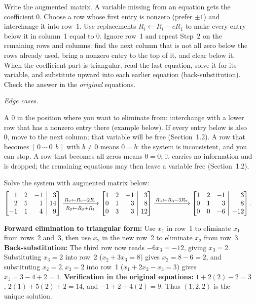 \documentclass[10pt]{scrartcl}
\makeatletter
\newcommand{\aug}[2]{\left[\begin{array}{@{}#1@{}}#2\end{array}\right]}
\makeatother
\begin{document}
\begin{steps}
  \ii Write the augmented matrix. A variable missing from an equation gets the coefficient $0$.
  \ii Choose a row whose first entry is nonzero (prefer $\pm1$) and interchange it into row~1. Use replacements $R_i\leftarrow R_i-cR_1$ to make every entry below it in column~1 equal to $0$.
  \ii Ignore row~1 and repeat Step~2 on the remaining rows and columns: find the next column that is not all zero below the rows already used, bring a nonzero entry to the top of it, and clear below it.
  \ii When the coefficient part is triangular, read the last equation, solve it for its variable, and substitute upward into each earlier equation (back-substitution).
  \ii Check the answer in the \emph{original} equations.
\end{steps}
\emph{Edge cases.}
\begin{itemize}
  \ii A $0$ in the position where you want to eliminate from: interchange with a lower row that has a nonzero entry there (example below). If every entry below is also $0$, move to the next column; that variable will be free (Section~1.2).
  \ii A row that becomes $[\,0\ \cdots\ 0\ \ b\,]$ with $b\ne0$ means $0=b$: the system is inconsistent, and you can stop.
  \ii A row that becomes all zeros means $0=0$: it carries no information and is dropped; the remaining equations may then leave a variable free (Section~1.2).
\end{itemize}

\begin{example*}
Solve the system with augmented matrix below:
\[
  \aug{rrr|r}{1 & 2 & -1 & 3 \\ 2 & 5 & 1 & 14 \\ -1 & 1 & 4 & 9}
  \xrightarrow[R_3\leftarrow R_3+R_1]{R_2\leftarrow R_2-2R_1}
  \aug{rrr|r}{1 & 2 & -1 & 3 \\ 0 & 1 & 3 & 8 \\ 0 & 3 & 3 & 12}
  \xrightarrow{R_3\leftarrow R_3-3R_2}
  \aug{rrr|r}{1 & 2 & -1 & 3 \\ 0 & 1 & 3 & 8 \\ 0 & 0 & -6 & -12}.
\]
\begin{steps}
  \ii \textbf{Forward elimination to triangular form:} Use $x_1$ in row~1 to eliminate $x_1$ from rows~2 and~3, then use $x_2$ in the new row~2 to eliminate $x_2$ from row~3.
  \ii \textbf{Back-substitution:} The third row now reads $-6x_3=-12$, giving $x_3=2$. Substituting $x_3=2$ into row~2 ($x_2+3x_3=8$) gives $x_2=8-6=2$, and substituting $x_2=2,x_3=2$ into row~1 ($x_1+2x_2-x_3=3$) gives $x_1=3-4+2=1$.
  \ii \textbf{Verification in the original equations:} $1+2(2)-2=3$, $2(1)+5(2)+2=14$, and $-1+2+4(2)=9$. Thus $(1,2,2)$ is the unique solution.
\end{steps}
\end{example*}
\end{document}
